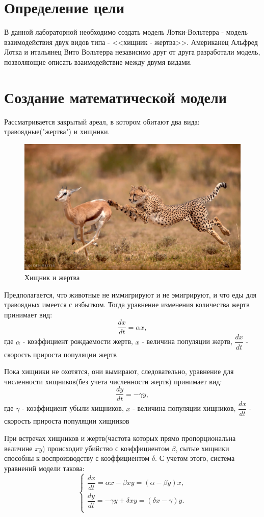 \documentclass[a4paper, 14pt]{extarticle}
\begin{document}
	\pagebreak	

	\section{Определение цели}
		В данной лабораторной необходимо создать модель Лотки-Вольтерра - модель взаимодействия двух видов типа - <<хищник - жертва>>. Американец Альфред Лотка и итальянец Вито Вольтерра независимо друг от друга разработали модель, позволяющие описать взаимодействие между двумя видами.

	\section{Создание математической модели}
		Рассматривается закрытый ареал, в котором обитают два вида: травоядные("жертва") и хищники. 
		\begin{figure}[H]
			\centering
			\includegraphics[width = \linewidth] {1.jpg}
			\caption[.] {Хищник и жертва}
		\end{figure}
		Предполагается, что животные не иммигрируют и не эмигрируют, и
		что еды для травоядных имеется с избытком. Тогда уравнение изменения количества жертв принимает вид:
			\[ \dfrac{dx}{dt} = \alpha x,\]
		где $\alpha$ - коэффициент рождаемости жертв, $x$ - величина популяции жертв, $\dfrac{dx}{dt}$ - скорость прироста популяции жертв

		Пока хищники не охотятся, они вымирают, следовательно, уравнение для численности хищников(без учета численности жертв) принимает вид:
			\[ \dfrac{dy}{dt} = -\gamma y,\]
		где $\gamma$ - коэффициент убыли хищников, $x$ - величина популяции хищников, $\dfrac{dx}{dt}$ - скорость прироста популяции хищников

		При встречах хищников и жертв(частота которых прямо пропорциональна величине $xy$) происходит убийство с коэффициентом $\beta$, сытые хищники способны к воспроизводству с коэффициентом $\delta$.
		С учетом этого, система уравнений модели такова:
		\[ \begin{cases}
			\dfrac{dx}{dt} = \alpha x - \beta xy = (\alpha - \beta y)x, \\
			\dfrac{dy}{dt} = - \gamma y + \delta xy = (\delta x - \gamma)y. \\
		    \end{cases}
		 \]
		 
\end{document}
